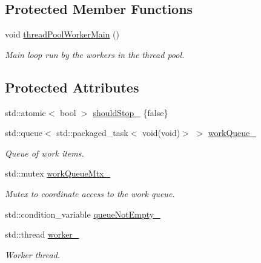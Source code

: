 \subsection*{Protected Member Functions}
\begin{DoxyCompactItemize}
\item 
\mbox{\label{classglow_1_1_thread_executor_ac6cccc80604fb029b68f955867edf425}} 
void \hyperlink{classglow_1_1_thread_executor_ac6cccc80604fb029b68f955867edf425}{thread\+Pool\+Worker\+Main} ()
\begin{DoxyCompactList}\small\item\em Main loop run by the workers in the thread pool. \end{DoxyCompactList}\end{DoxyCompactItemize}
\subsection*{Protected Attributes}
\begin{DoxyCompactItemize}
\item 
std\+::atomic$<$ bool $>$ \hyperlink{classglow_1_1_thread_executor_a88d31feb58f5b19d6a6892b55a80f102}{should\+Stop\+\_\+} \{false\}
\item 
\mbox{\label{classglow_1_1_thread_executor_a2c3f8f552f945a365279701c77d8f20e}} 
std\+::queue$<$ std\+::packaged\+\_\+task$<$ void(void)$>$ $>$ \hyperlink{classglow_1_1_thread_executor_a2c3f8f552f945a365279701c77d8f20e}{work\+Queue\+\_\+}
\begin{DoxyCompactList}\small\item\em Queue of work items. \end{DoxyCompactList}\item 
\mbox{\label{classglow_1_1_thread_executor_a60b0448ed3cf0ea306d043db4853d29c}} 
std\+::mutex \hyperlink{classglow_1_1_thread_executor_a60b0448ed3cf0ea306d043db4853d29c}{work\+Queue\+Mtx\+\_\+}
\begin{DoxyCompactList}\small\item\em Mutex to coordinate access to the work queue. \end{DoxyCompactList}\item 
std\+::condition\+\_\+variable \hyperlink{classglow_1_1_thread_executor_ad2bd0f888b7c19935724e2ddfbe7706f}{queue\+Not\+Empty\+\_\+}
\item 
\mbox{\label{classglow_1_1_thread_executor_aa62823b4869610631e501af9919fab52}} 
std\+::thread \hyperlink{classglow_1_1_thread_executor_aa62823b4869610631e501af9919fab52}{worker\+\_\+}
\begin{DoxyCompactList}\small\item\em Worker thread. \end{DoxyCompactList}\end{DoxyCompactItemize}


